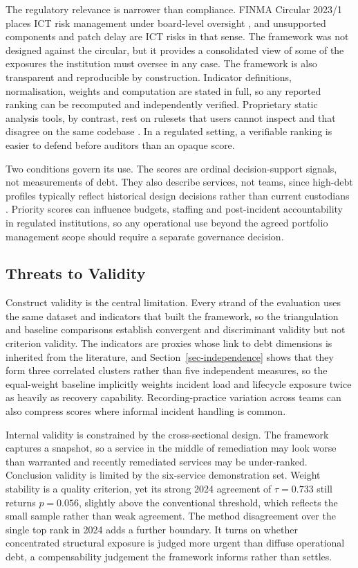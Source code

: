 \documentclass[
  journal,
]{IEEEtran}%
\begin{document}
The regulatory relevance is narrower than compliance. FINMA Circular
2023/1 places ICT risk management under board-level oversight
, and unsupported
components and patch delay are ICT risks in that sense. The framework
was not designed against the circular, but it provides a consolidated
view of some of the exposures the institution must oversee in any case.
The framework is also transparent and reproducible by construction.
Indicator definitions, normalisation, weights and computation are stated
in full, so any reported ranking can be recomputed and independently
verified. Proprietary static analysis tools, by contrast, rest on
rulesets that users cannot inspect and that disagree on the same
codebase
. In a
regulated setting, a verifiable ranking is easier to defend before
auditors than an opaque score.

Two conditions govern its use. The scores are ordinal decision-support
signals, not measurements of debt. They also describe services, not
teams, since high-debt profiles typically reflect historical design
decisions rather than current custodians
. Priority scores can
influence budgets, staffing and post-incident accountability in
regulated institutions, so any operational use beyond the agreed
portfolio management scope should require a separate governance
decision.

\subsection{Threats to Validity}\label{threats-to-validity}

Construct validity is the central limitation. Every strand of the
evaluation uses the same dataset and indicators that built the
framework, so the triangulation and baseline comparisons establish
convergent and discriminant validity but not criterion validity. The
indicators are proxies whose link to debt dimensions is inherited from
the literature, and Section~\ref{sec-independence} shows that they form
three correlated clusters rather than five independent measures, so the
equal-weight baseline implicitly weights incident load and lifecycle
exposure twice as heavily as recovery capability. Recording-practice
variation across teams can also compress scores where informal incident
handling is common.

Internal validity is constrained by the cross-sectional design. The
framework captures a snapshot, so a service in the middle of remediation
may look worse than warranted and recently remediated services may be
under-ranked. Conclusion validity is limited by the six-service
demonstration set. Weight stability is a quality criterion, yet its
strong 2024 agreement of \(\tau = 0.733\) still returns \(p = 0.056\),
slightly above the conventional threshold, which reflects the small
sample rather than weak agreement. The method disagreement over the
single top rank in 2024 adds a further boundary. It turns on whether
concentrated structural exposure is judged more urgent than diffuse
operational debt, a compensability judgement the framework informs
rather than settles.
\end{document}
